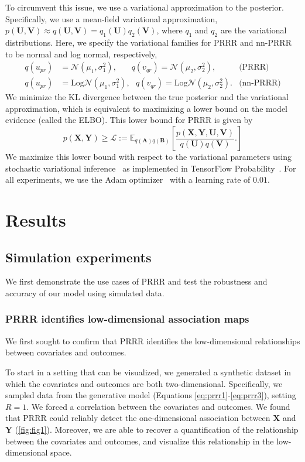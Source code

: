 \documentclass{bmcart}
\begin{document}
To circumvent this issue, we use a variational approximation to the posterior. Specifically, we use a mean-field variational approximation, $p(\mathbf{U}, \mathbf{V}) \approx q(\mathbf{U}, \mathbf{V}) = q_1(\mathbf{U})q_2(\mathbf{V})$, where $q_1$ and $q_2$ are the variational distributions. Here, we specify the variational families for PRRR and nn-PRRR to be normal and log normal, respectively,
\begin{align}
    q(u_{pr}) &= \mathcal{N}(\mu_1, \sigma^2_1),~~~~~~~~q(v_{qr}) = \mathcal{N}(\mu_2, \sigma^2_2), & \text{(PRRR)} \\
    q(u_{pr}) &= \text{Log$\mathcal{N}$}(\mu_1, \sigma^2_1),~~~q(v_{qr}) = \text{Log$\mathcal{N}$}(\mu_2, \sigma^2_2). & \text{(nn-PRRR)}
\end{align}
We minimize the KL divergence between the true posterior and the variational approximation, which is equivalent to maximizing a lower bound on the model evidence (called the ELBO). This lower bound for PRRR is given by
\begin{equation*}
    p(\mathbf{X}, \mathbf{Y}) \geq \mathcal{L} := \mathbb{E}_{q(\mathbf{A})q(\mathbf{B})}\left[ \frac{p(\mathbf{X}, \mathbf{Y}, \mathbf{U}, \mathbf{V})}{q(\mathbf{U})q(\mathbf{V})}. \right]
\end{equation*}
We maximize this lower bound with respect to the variational parameters using stochastic variational inference~\citep{hoffman2013stochastic} as implemented in TensorFlow Probability~\citep{dillon2017tensorflow}. For all experiments, we use the Adam optimizer~\citep{kingma2014adam} with a learning rate of $0.01$.

\section*{Results}
\subsection*{Simulation experiments}
We first demonstrate the use cases of PRRR and test the robustness and accuracy of our model using simulated data.

\subsubsection*{PRRR identifies low-dimensional association maps}
We first sought to confirm that PRRR identifies the low-dimensional relationships between covariates and outcomes. 

To start in a setting that can be visualized, we generated a synthetic dataset in which the covariates and outcomes are both two-dimensional. Specifically, we sampled data from the generative model (Equations \eqref{eq:prrr1}-\eqref{eq:prrr3}), setting $R=1$. We forced a correlation between the covariates and outcomes. We found that PRRR could reliably detect the one-dimensional association between $\mathbf{X}$ and $\mathbf{Y}$ (\autoref{fig:fig1}).
Moreover, we are able to recover a quantification of the relationship between the covariates and outcomes, and visualize this relationship in the low-dimensional space. 
\end{document}

